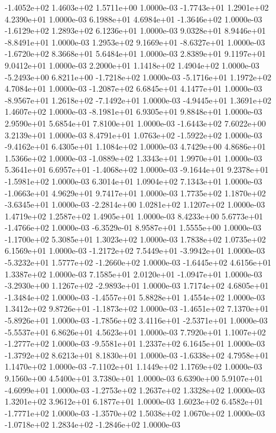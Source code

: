 -1.4052e+02  1.4603e+02  1.5711e+00  1.0000e-03
-1.7743e+01  1.2901e+02  4.2390e+01  1.0000e-03
 6.1988e+01  4.6984e+01 -1.3646e+02  1.0000e-03
-1.6129e+02  1.2893e+02  6.1236e+01  1.0000e-03
 9.0328e+01  8.9446e+01 -8.8491e+01  1.0000e-03
 1.2953e+02  9.1669e+01 -8.6327e+01  1.0000e-03
-1.6720e+02  8.3668e+01  5.6484e+01  1.0000e-03
2.8389e+01 9.1197e+01 9.0412e+01  1.0000e-03
2.2000e+01 1.1418e+02 1.4904e+02  1.0000e-03
-5.2493e+00  6.8211e+00 -1.7218e+02  1.0000e-03
-5.1716e+01  1.1972e+02  4.7084e+01  1.0000e-03
-1.2087e+02  6.6845e+01  4.1477e+01  1.0000e-03
-8.9567e+01  1.2618e+02 -7.1492e+01  1.0000e-03
-4.9445e+01  1.3691e+02  1.4607e+02  1.0000e-03
-8.1981e+01  6.9305e+01  9.8848e+01  1.0000e-03
2.9590e+01 5.6854e+01 7.8100e+01  1.0000e-03
-1.6443e+02  7.6022e+00  3.2139e+01  1.0000e-03
 8.4791e+01  1.0763e+02 -1.5922e+02  1.0000e-03
-9.4162e+01  6.4305e+01  1.1084e+02  1.0000e-03
4.7429e+00 4.8686e+01 1.5366e+02  1.0000e-03
-1.0889e+02  1.3343e+01  1.9970e+01  1.0000e-03
 5.3641e+01  6.6957e+01 -1.4068e+02  1.0000e-03
-9.1644e+01  9.2378e+01 -1.5981e+02  1.0000e-03
6.3014e+01 1.0904e+02 7.1343e+01  1.0000e-03
-1.0663e+01  4.9629e+01  9.7417e+01  1.0000e-03
 1.7735e+02  1.1870e+02 -3.6345e+01  1.0000e-03
-2.2814e+00  1.0281e+02  1.1207e+02  1.0000e-03
1.4719e+02 1.2587e+02 1.4905e+01  1.0000e-03
 8.4233e+00  5.6773e+01 -1.4766e+02  1.0000e-03
-6.3529e-01  8.9587e+01  1.5555e+00  1.0000e-03
-1.1700e+02  5.3085e+01  1.3023e+02  1.0000e-03
1.7838e+02 1.0735e+02 6.1569e+01  1.0000e-03
-1.2172e+02  7.5449e+01 -3.9942e+01  1.0000e-03
-5.3232e+01  1.5777e+02 -1.2660e+02  1.0000e-03
-1.6445e+02  4.6156e+01  1.3387e+02  1.0000e-03
 7.1585e+01  2.0120e+01 -1.0947e+01  1.0000e-03
-3.2930e+00  1.1267e+02 -2.9893e+01  1.0000e-03
 1.7174e+02  4.6805e+01 -1.3484e+02  1.0000e-03
-1.4557e+01  5.8828e+01  1.4554e+02  1.0000e-03
 1.3412e+02  9.8726e+01 -1.1873e+02  1.0000e-03
-1.4651e+02  7.1370e+01 -5.8926e+01  1.0000e-03
-1.7856e+02  3.4116e+01 -2.5371e+01  1.0000e-03
-5.5537e+01  6.8626e+01  4.5623e+01  1.0000e-03
 7.7920e+01  1.1007e+02 -1.2777e+02  1.0000e-03
-9.5581e+01  1.2337e+02  6.1645e+01  1.0000e-03
-1.3792e+02  8.6213e+01  8.1830e+01  1.0000e-03
-1.6338e+02  4.7958e+01  1.1470e+02  1.0000e-03
-7.1102e+01  1.1449e+02  1.1769e+02  1.0000e-03
9.1560e+00 4.5400e+01 3.7380e+01  1.0000e-03
 6.6390e+00  5.9107e+01 -4.6099e+01  1.0000e-03
-1.2753e+02  1.2637e+02  1.3328e+02  1.0000e-03
1.3201e+02 3.9612e+01 6.1877e+01  1.0000e-03
 1.6023e+02  6.4582e+01 -1.7771e+02  1.0000e-03
-1.3570e+02  1.5038e+02  1.0670e+02  1.0000e-03
-1.0718e+02  1.2834e+02 -1.2846e+02  1.0000e-03
